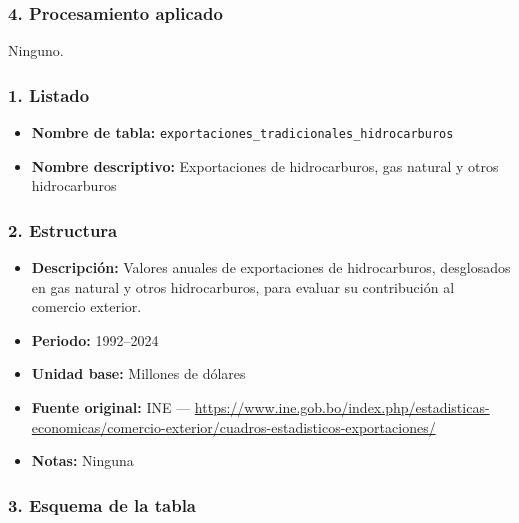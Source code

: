 \documentclass[12pt,a4paper]{article}
\begin{document}
\subsubsection*{4. Procesamiento aplicado}
Ninguno.

\subsubsection*{1. Listado}
\begin{itemize}
  \item \textbf{Nombre de tabla:} \texttt{exportaciones\_tradicionales\_hidrocarburos}
  \item \textbf{Nombre descriptivo:} Exportaciones de hidrocarburos, gas natural y otros hidrocarburos
\end{itemize}

\subsubsection*{2. Estructura}
\begin{itemize}
  \item \textbf{Descripción:} Valores anuales de exportaciones de hidrocarburos, desglosados en gas natural y otros hidrocarburos, para evaluar su contribución al comercio exterior.
  \item \textbf{Periodo:} 1992--2024
  \item \textbf{Unidad base:} Millones de dólares
  \item \textbf{Fuente original:} INE — \url{https://www.ine.gob.bo/index.php/estadisticas-economicas/comercio-exterior/cuadros-estadisticos-exportaciones/}
  \item \textbf{Notas:} Ninguna
\end{itemize}

\subsubsection*{3. Esquema de la tabla}
\end{document}
